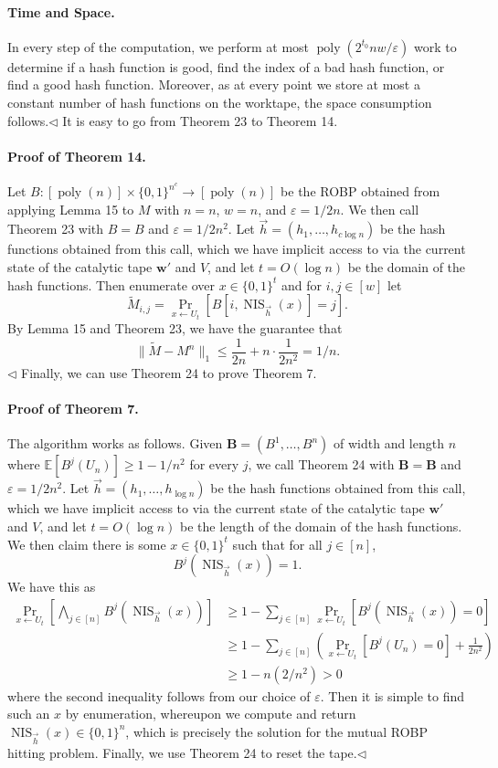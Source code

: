 \paragraph{Time and Space.} In every step of the computation, we perform at most $\operatorname{poly}(2^{t_0}nw/\varepsilon)$ work to determine if a hash function is good, find the index of a bad hash function, or find a good hash function. Moreover, as at every point we store at most a constant number of hash functions on the worktape, the space consumption follows.\hfill$\triangleleft$
It is easy to go from Theorem 23 to Theorem 14.
\paragraph{Proof of Theorem 14.} Let $B:[\operatorname{poly}(n)]\times\{0,1\}^{n^c}\to[\operatorname{poly}(n)]$ be the ROBP obtained from applying Lemma 15 to $M$ with $n=n$, $w=n$, and $\varepsilon=1/2n$. We then call Theorem 23 with $B=B$ and $\varepsilon=1/2n^2$. Let $\vec h=(h_1,\ldots,h_{c\log n})$ be the hash functions obtained from this call, which we have implicit access to via the current state of the catalytic tape $\mathbf w'$ and $V$, and let $t=O(\log n)$ be the domain of the hash functions. Then enumerate over $x\in\{0,1\}^t$ and for $i,j\in[w]$ let
\[\widetilde M_{i,j}=\Pr_{x\leftarrow U_t}[B[i,\operatorname{NIS}_{\vec h}(x)]=j].\]
By Lemma 15 and Theorem 23, we have the guarantee that
\[\|\widetilde M-M^n\|_1\leq\frac1{2n}+n\cdot\frac1{2n^2}=1/n.\]\hfill$\triangleleft$
Finally, we can use Theorem 24 to prove Theorem 7.
\paragraph{Proof of Theorem 7.} The algorithm works as follows. Given $\mathbf B=(B^1,\ldots,B^n)$ of width and length $n$ where $\mathbb E[B^j(U_n)]\geq1-1/n^2$ for every $j$, we call Theorem 24 with $\mathbf B=\mathbf B$ and $\varepsilon=1/2n^2$. Let $\vec h=(h_1,\ldots,h_{\log n})$ be the hash functions obtained from this call, which we have implicit access to via the current state of the catalytic tape $\mathbf w'$ and $V$, and let $t=O(\log n)$ be the length of the domain of the hash functions. We then claim there is some $x\in\{0,1\}^t$ such that for all $j\in[n]$,
\[B^j(\operatorname{NIS}_{\vec h}(x))=1.\]
We have this as
\begin{align*}
\Pr_{x\leftarrow U_t}\left[\bigwedge_{j\in[n]}B^j(\operatorname{NIS}_{\vec h}(x))\right]&\geq1-\sum_{j\in[n]}\Pr_{x\leftarrow U_t}[B^j(\operatorname{NIS}_{\vec h}(x))=0]\\
&\geq1-\sum_{j\in[n]}\left(\Pr_{x\leftarrow U_t}[B^j(U_n)=0]+\frac1{2n^2}\right)\\
&\geq1-n(2/n^2)>0
\end{align*}
where the second inequality follows from our choice of $\varepsilon$. Then it is simple to find such an $x$ by enumeration, whereupon we compute and return $\operatorname{NIS}_{\vec h}(x)\in\{0,1\}^n$, which is precisely the solution for the mutual ROBP hitting problem. Finally, we use Theorem 24 to reset the tape.\hfill$\triangleleft$
